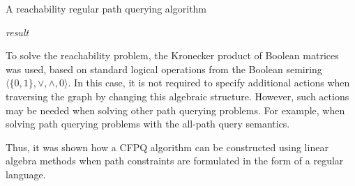 \begin{algorithm}
\begin{algorithmic}[1]
\caption{A reachability regular path querying algorithm}
\label{lst:fsa_intersection}
    \EndIf
    \EndFor
    \State \Return \textit{result}
\EndFunction
\end{algorithmic}
\end{algorithm}

To solve the reachability problem, the Kronecker product of Boolean matrices was used, based on standard logical operations from the Boolean semiring $\langle \{0, 1\}, \vee, \wedge, 0 \rangle$. In this case, it is not required to specify additional actions when traversing the graph by changing this algebraic structure. However, such actions may be needed when solving other path querying problems. For example, when solving path querying problems with the all-path query semantics.

Thus, it was shown how a CFPQ algorithm can be constructed using linear algebra methods when path constraints are formulated in the form of a regular language.


